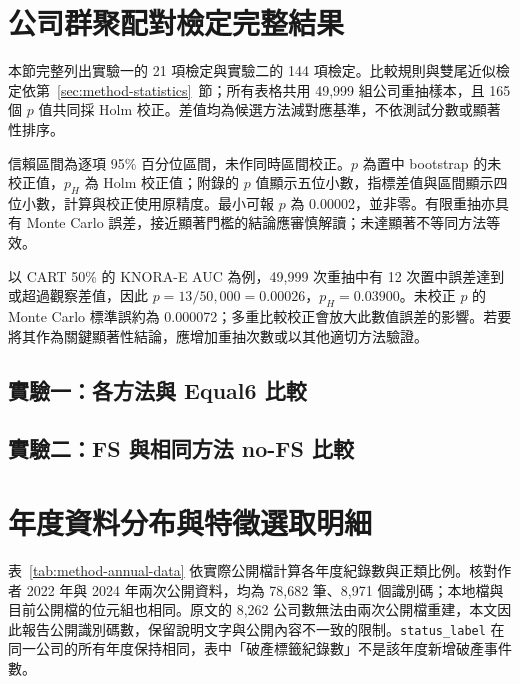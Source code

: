 \clearpage
\section{公司群聚配對檢定完整結果}\label{sec:stats-full}

本節完整列出實驗一的 21 項檢定與實驗二的 144 項檢定。比較規則與雙尾近似檢定依第~\ref{sec:method-statistics}~節；所有表格共用 49,999 組公司重抽樣本，且 165 個 \(p\) 值共同採 Holm 校正。差值均為候選方法減對應基準，不依測試分數或顯著性排序。

信賴區間為逐項 95\% 百分位區間，未作同時區間校正。\(p\) 為置中 bootstrap 的未校正值，\(p_H\) 為 Holm 校正值；附錄的 \(p\) 值顯示五位小數，指標差值與區間顯示四位小數，計算與校正使用原精度。最小可報 \(p\) 為 0.00002，並非零。有限重抽亦具有 Monte Carlo 誤差，接近顯著門檻的結論應審慎解讀；未達顯著不等同方法等效。

以 CART 50\% 的 KNORA-E AUC 為例，49,999 次重抽中有 12 次置中誤差達到或超過觀察差值，因此 \(p=13/50{,}000=0.00026\)，\(p_H=0.03900\)。未校正 \(p\) 的 Monte Carlo 標準誤約為 0.000072；多重比較校正會放大此數值誤差的影響。若要將其作為關鍵顯著性結論，應增加重抽次數或以其他適切方法驗證。

\subsection*{實驗一：各方法與 Equal6 比較}


\subsection*{實驗二：FS 與相同方法 no-FS 比較}




\clearpage
\section{年度資料分布與特徵選取明細}\label{sec:appendix-data-fs}

表~\ref{tab:method-annual-data} 依實際公開檔計算各年度紀錄數與正類比例。核對作者 2022 年與 2024 年兩次公開資料，均為 78,682 筆、8,971 個識別碼；本地檔與目前公開檔的位元組也相同。原文的 8,262 公司數無法由兩次公開檔重建，本文因此報告公開識別碼數，保留說明文字與公開內容不一致的限制。\nolinkurl{status_label} 在同一公司的所有年度保持相同，表中「破產標籤紀錄數」不是該年度新增破產事件數。

